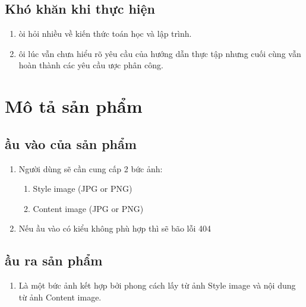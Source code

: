\documentclass{article}
\begin{document}
\subsection{  Kh\'{o} kh\u{a}n khi thực hiện}

\begin{enumerate}
\item  {\DJ}\`{o}i hỏi nhiều về kiến thức to\'{a}n học v\`{a} lập tr\`{i}nh.

\item  {\DJ}\^{o}i l\'{u}c vẫn chưa hiểu r\~{o} y\^{e}u cầu của hướng dẫn thực tập nhưng cuối c\`{u}ng vẫn ho\`{a}n th\`{a}nh c\'{a}c y\^{e}u cầu {\dj}ược ph\^{a}n c\^{o}ng.
\end{enumerate}

\noindent 


\section{ M\^{o} tả sản phẩm}


\subsection{ {\DJ}ầu v\`{a}o của sản phẩm}

\begin{enumerate}
\item  Người d\`{u}ng sẽ cần cung cấp 2 bức ảnh:

\begin{enumerate}
\item  Style image (JPG or PNG) 

\item  Content image (JPG or PNG) 
\end{enumerate}

\item  Nếu {\dj}ầu v\`{a}o c\'{o} kiểu kh\^{o}ng ph\`{u} hợp th\`{i} sẽ b\~{a}o lỗi 404
\end{enumerate}


\subsection{ {\DJ}ầu ra sản phẩm}

\begin{enumerate}
\item  L\`{a} một bức ảnh kết hợp bởi phong c\'{a}ch lấy từ ảnh Style image v\`{a} nội dung từ ảnh Content image.
\end{enumerate}
\end{document}
